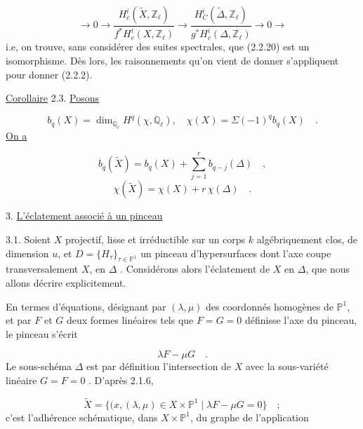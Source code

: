 \begin{equation}\tag{2.2.27}
\longrightarrow 0 \longrightarrow \frac{H^i_c(\widetilde{X},\mathbb{Z}_\ell)}{f^*H^i_c(X,\mathbb{Z}_\ell)} \longrightarrow \frac{H^i_C(\widetilde{\Delta},\mathbb{Z}_\ell)}{g^*H^i_c(\Delta,\mathbb{Z}_\ell)} \longrightarrow 0 \longrightarrow
\end{equation}
i.e, on trouve, sans considérer des suites spectrales, que (2.2.20) est un isomorphisme. Dès lors, les raisonnements qu'on vient de donner s'appliquent pour donner (2.2.2).

\underline{Corollaire} 2.3.  \underline{Posons}

\begin{equation*}
b_q(X) = \dim_{\mathbb{Q}_\ell} H^q(\chi,\mathbb{Q}_\ell), \quad \chi(X) = \Sigma(-1)^q b_q(X) \quad .
\end{equation*}
\underline{On a}

\begin{equation}\tag{2.3.1}
b_q(\widetilde{X}) = b_q(X) + \sum_{j=1}^{r} b_{q-j}(\Delta) \quad ,
\end{equation}
\begin{equation}\tag{2.3.2}
\chi(\widetilde{X}) = \chi(X) + r\,\chi(\Delta) \quad .
\end{equation}



3. \underline{L'éclatement associé à un pinceau}

3.1.  Soient $X$ projectif, lisse et irréductible sur un corps $k$ algébriquement clos, de dimension $u$, et $D = \{H_\tau\}_{\tau \in \mathbb{P}^1}$ un pinceau d'hypersurfaces dont l'axe coupe transversalement $X$, en $\Delta$ . Considérons alors l'éclatement de $X$ en $\Delta$, que nous allons décrire explicitement.

En termes d'équations, désignant par $(\lambda,\mu)$ des coordonnés homogènes de $\mathbb{P}^1$, et par $F$ et $G$ deux formes linéaires tels que $F = G = 0$ définisse l'axe du pinceau, le pinceau s'écrit

\begin{equation}\tag{3.1.1}
\lambda F - \mu G \quad .
\end{equation}
Le sous-schéma $\Delta$ est par définition l'intersection de $X$ avec la sous-variété linéaire $G = F = 0$ . D'après 2.1.6,

\begin{equation}\tag{3.1.2}
\widetilde{X} = \{(x,(\lambda,\mu) \in X \times \mathbb{P}^1 \mid \lambda F - \mu G = 0\} \quad ;
\end{equation}
c'est l'adhérence schématique, dans $X \times \mathbb{P}^1$, du graphe de l'application

